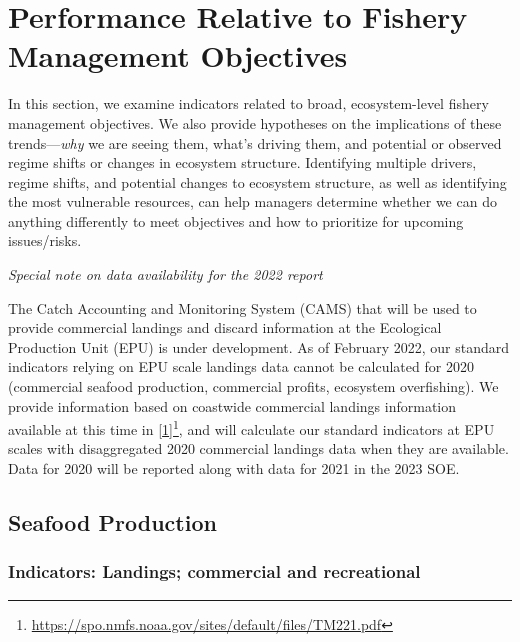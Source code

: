 \documentclass[
  10pt,
]{article}
\begin{document}
\hypertarget{performance-relative-to-fishery-management-objectives}{%
\section{Performance Relative to Fishery Management
Objectives}\label{performance-relative-to-fishery-management-objectives}}

In this section, we examine indicators related to broad, ecosystem-level
fishery management objectives. We also provide hypotheses on the
implications of these trends---\emph{why} we are seeing them, what's
driving them, and potential or observed regime shifts or changes in
ecosystem structure. Identifying multiple drivers, regime shifts, and
potential changes to ecosystem structure, as well as identifying the
most vulnerable resources, can help managers determine whether we can do
anything differently to meet objectives and how to prioritize for
upcoming issues/risks.

\emph{Special note on data availability for the 2022 report}

The Catch Accounting and Monitoring System (CAMS) that will be used to
provide commercial landings and discard information at the Ecological
Production Unit (EPU) is under development. As of February 2022, our
standard indicators relying on EPU scale landings data cannot be
calculated for 2020 (commercial seafood production, commercial profits,
ecosystem overfishing). We provide information based on coastwide
commercial landings information available at this time in
{[}\protect\hyperlink{ref-thunberg_northeast_2021}{1}{]}\footnote{\url{https://spo.nmfs.noaa.gov/sites/default/files/TM221.pdf}},
and will calculate our standard indicators at EPU scales with
disaggregated 2020 commercial landings data when they are available.
Data for 2020 will be reported along with data for 2021 in the 2023 SOE.

\hypertarget{seafood-production}{%
\subsection{Seafood Production}\label{seafood-production}}

\hypertarget{indicators-landings-commercial-and-recreational}{%
\subsubsection{Indicators: Landings; commercial and
recreational}\label{indicators-landings-commercial-and-recreational}}
\end{document}
